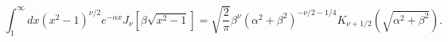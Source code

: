 \begin{equation}
\int_1^{\infty} dx (x^2 -1)^{\nu/2} e^{- \alpha x} J_{\nu}[\beta
\sqrt{x^2 -1}] =\sqrt{\frac{2}{\pi}}\beta^{\nu} (\alpha^2 +
\beta^2)^{-\nu/2  - 1/4} K_{\nu + 1/2} (\sqrt{\alpha^2 + \beta^2}).
\end{equation}

